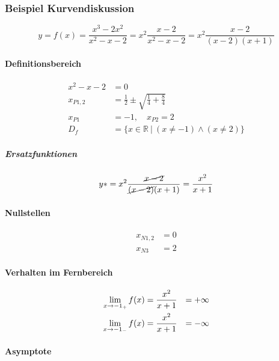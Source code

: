 \subsubsection{Beispiel Kurvendiskussion}

\[
	y = f(x) = \frac{x^3 - 2x^2}{x^2 - x - 2} = x^2 \frac{x - 2}{x^2 - x - 2} = x^2 \frac{x - 2}{(x-2)(x+1)}
\]

\paragraph{Definitionsbereich}

\begin{align*}
	x^2 - x - 2 & = 0                                                        \\
	x_{P1,2}    & = \frac{1}{2} \pm \sqrt{\frac{1}{4} + \frac{8}{4}}         \\
	x_{P1}      & = -1,\quad x_{P2} = 2                                      \\
	D_f         & = \{ x \in \mathbb{R}\ |\ (x \neq -1) \wedge (x \neq 2) \}
\end{align*}

\subparagraph{Ersatzfunktionen}

\begin{align*}
	y* = x^2 \frac{\cancel{x - 2}}{\cancel{(x - 2)}(x + 1)} = \frac{x^2}{x + 1}
\end{align*}

\paragraph{Nullstellen}

\begin{align*}
	x_{N1,2} & = 0 \\
	x_{N3}   & = 2
\end{align*}

\paragraph{Verhalten im Fernbereich}

\begin{alignat*}{2}
	\lim_{x \rightarrow{} -1_+} f(x) & = \frac{x^2}{x + 1} & = +\infty \\
	\lim_{x \rightarrow{} -1_-} f(x) & = \frac{x^2}{x + 1} & = -\infty
\end{alignat*}

\paragraph{Asymptote}

